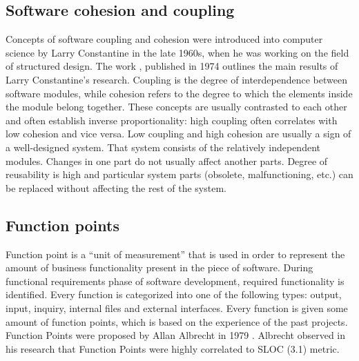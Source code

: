 \subsection{Software cohesion and coupling}
\label{background-cohesion-and-coupling}
\qquad Concepts of software coupling and cohesion were introduced into computer science by Larry Constantine in the late 1960s, when he was working on the field of structured design. The work \cite{cohesion-coupling-paper}, published in 1974 outlines the main results of Larry Constantine's research. Coupling is the degree of interdependence between software modules, while cohesion refers to the degree to which the elements inside the module belong together. These concepts are usually contrasted to each other and often establish inverse proportionality: high coupling often correlates with low cohesion and vice versa. Low coupling and high cohesion are usually a sign of a well-designed system. That system consists of the relatively independent modules. Changes in one part do not usually affect another parts. Degree of reusability is high and particular
system parts (obsolete, malfunctioning, etc.) can be replaced without affecting the rest of the system.

\subsection{Function points}
\label{background-function-points}
\qquad Function point is a “unit of measurement” that is used in order to represent the amount of business functionality present in the piece of software. During functional requirements phase of software development, required functionality is identified. Every function is categorized into one of the following types: output, input, inquiry, internal files and external interfaces. Every function is given some amount of function points, which is based on the experience of the past projects. Function Points were proposed by Allan Albrecht in 1979 \cite{function-points-paper}. Albrecht observed in his research that Function Points were highly correlated to SLOC (3.1) metric.

